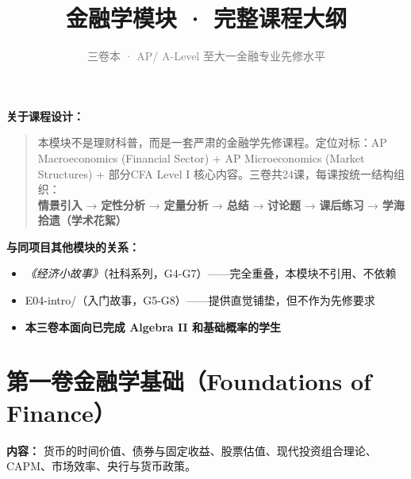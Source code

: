 \documentclass[a4paper,11pt]{ctexart}
\title{\textcolor{blue!70!black}{\Huge\textbf{金融学模块 · 完整课程大纲}}}
\subtitle{\textcolor{gray}{三卷本 · AP/ A-Level 至大一金融专业先修水平}}
\author{}
\date{}
\begin{document}
\maketitle
\thispagestyle{empty}

\noindent\textbf{关于课程设计：}

\begin{quote}
本模块不是理财科普，而是一套严肃的金融学先修课程。定位对标：AP Macroeconomics (Financial Sector) + AP Microeconomics (Market Structures) + 部分CFA Level I 核心内容。三卷共24课，每课按统一结构组织：\\
\textbf{情景引入} → \textbf{定性分析} → \textbf{定量分析} → \textbf{总结} → \textbf{讨论题} → \textbf{课后练习} → \textbf{学海拾遗（学术花絮）}
\end{quote}

\noindent\textbf{与同项目其他模块的关系：}
\begin{itemize}
  \item \textit{《经济小故事》}（社科系列，G4-G7）——完全重叠，本模块不引用、不依赖
  \item E04-intro/（入门故事，G5-G8）——提供直觉铺垫，但不作为先修要求
  \item \textbf{本三卷本面向已完成 Algebra II 和基础概率的学生}
\end{itemize}

\newpage

\section*{\textcolor{blue!70!black}{第一卷\quad 金融学基础（Foundations of Finance）}}

\textbf{内容：} 货币的时间价值、债券与固定收益、股票估值、现代投资组合理论、CAPM、市场效率、央行与货币政策。\vspace{0.3cm}
\end{document}
